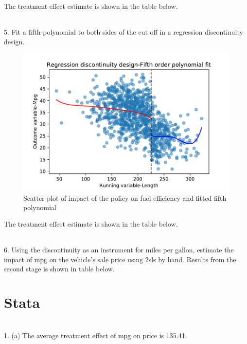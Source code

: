 \documentclass{article}
\begin{document}
 The treatment effect estimate is shown in the table below. 
 \begin{table}[H]
 \centering
 
 	
 \end{table}


~\\
5. Fit a fifth-polynomial to both sides of the cut off in a regression discontinuity design. 
\begin{figure}[H]
\centering
 \includegraphics[scale = 0.9]{q5.pdf}
 \caption{Scatter plot of impact of the policy on fuel efficiency and fitted fifth polynomial}
 
 \end{figure}


 The treatment effect estimate is shown in the table below. 
 \begin{table}[H]
 \centering
 
 	
 \end{table}
~\\
6. Using the discontinuity as an instrument for miles per gallon, estimate the impact of mpg on the vehicle's sale price using 2sls by hand. 
Results from the second stage is shown in table below. 
\begin{table}[H]
	\centering
	
\end{table}

\section{Stata}
~\\
1. (a) The average treatment effect of mpg on price is 135.41. 

\begin{table}[H]
	\centering
	
\end{table}
~\\
\end{document}
